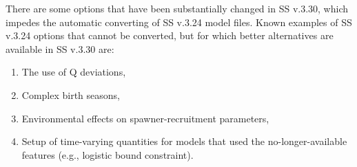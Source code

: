 \noindent There are some options that have been substantially changed in SS v.3.30, which impedes the automatic converting of SS v.3.24 model files. Known examples of SS v.3.24 options that cannot be converted, but for which better alternatives are available in SS v.3.30 are:
\begin{enumerate}
	\item The use of Q deviations,
	\item Complex birth seasons,
	\item Environmental effects on spawner-recruitment parameters,
	\item Setup of time-varying quantities for models that used the no-longer-available features (e.g., logistic bound constraint).\end{enumerate}

\pagebreak
